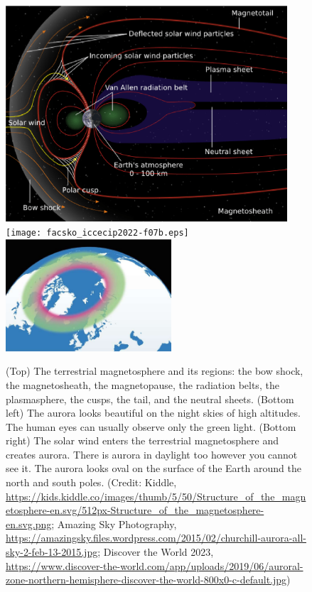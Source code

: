 \documentclass[sn-aps]{sn-jnl}%
\begin{document}
\begin{figure}[h]
\centering
\includegraphics[width=0.935\textwidth]{facsko_iccecip2022-f07a.eps}
\texttt{[image: facsko\_iccecip2022-f07b.eps]}
\includegraphics[width=0.55\textwidth]{facsko_iccecip2022-f07c.eps}
\caption{(Top) The terrestrial magnetosphere and its regions: the bow shock, the magnetosheath, the magnetopause, the radiation belts, the plasmasphere, the cusps, the tail, and the neutral sheets. (Bottom left) The aurora looks beautiful on the night skies of high altitudes. The human eyes can usually observe only the green light. (Bottom right) The solar wind enters the terrestrial magnetosphere and creates aurora. There is aurora in daylight too however you cannot see it. The aurora looks oval on the surface of the Earth around the north and south poles. (Credit: Kiddle, \url{https://kids.kiddle.co/images/thumb/5/50/Structure_of_the_magnetosphere-en.svg/512px-Structure_of_the_magnetosphere-en.svg.png}; Amazing Sky Photography, \url{https://amazingsky.files.wordpress.com/2015/02/churchill-aurora-all-sky-2-feb-13-2015.jpg}; Discover the World 2023, \url{https://www.discover-the-world.com/app/uploads/2019/06/auroral-zone-northern-hemisphere-discover-the-world-800x0-c-default.jpg})} \label{fig:aurora}
\end{figure}
\end{document}
